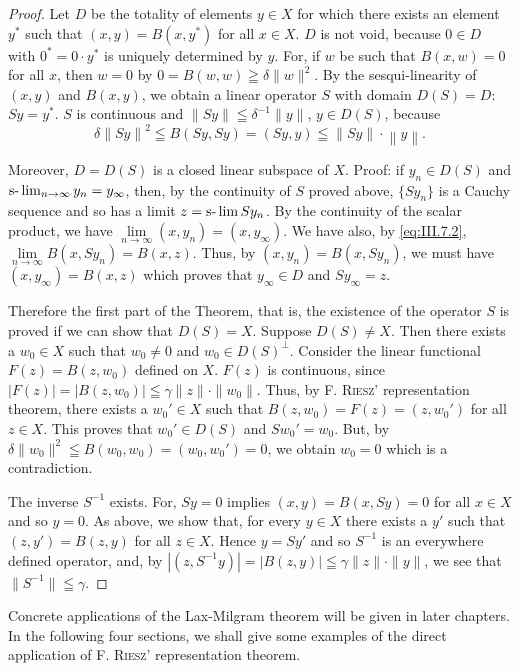 \begin{proof}
 Let $D$ be the totality of elements $y \in X$ for which there exists an element $y^*$ such that $(x, y) = B(x, y^*)$ for all $x \in X$. $D$ is not void, because $0 \in D$ with $0^* = 0 \cdot y^*$ is uniquely determined by $y$. For, if $w$ be such that $B(x, w) = 0$ for all $x$, then $w = 0$ by $0 = B(w, w) \geqq \delta \|w\|^2$. By the sesqui-linearity of $(x, y)$ and $B(x, y)$, we obtain a linear operator $S$ with domain $D(S) = D$: $Sy = y^*$. $S$ is continuous and $\|Sy\| \leqq \delta^{-1} \|y\|$, $y \in D(S)$, because 
\[
\delta \left\| S y \right\| ^{2} \leqq B (S y, S y) = (S y, y) \leqq \left\| S y \right\| \cdot \left\| y \right\|. \]

Moreover, $D = D(S)$ is a closed linear subspace of $X$. Proof: if $y_{n} \in D(S)$ and $\text{s-}\lim\nolimits_{n \to \infty} y_{n} = y_{\infty}$, then, by the continuity of $S$ proved above, $\{Sy_{n}\}$ is a Cauchy sequence and so has a limit $z = \text{s-}\lim Sy_{n}$. By the continuity of the scalar product, we have $\lim\limits_{n \to \infty} (x, y_{n}) = (x, y_{\infty})$. We have also, by \eqref{eq:III.7.2}, $\lim\limits_{n\to \infty}B(x,Sy_n) = B(x,z)$. Thus, by $(x,y_{n}) = B(x,Sy_{n})$, we must have $(x,y_{\infty}) = B(x,z)$ which proves that $y_{\infty}\in D$ and $Sy_{\infty} = z$. 

Therefore the first part of the Theorem, that is, the existence of the operator $S$ is proved if we can show that $D(S) = X$. Suppose $D(S) \neq X$. Then there exists a $w_0 \in X$ such that $w_0 \neq 0$ and $w_0 \in D(S)^\perp$. Consider the linear functional $F(z) = B(z, w_0)$ defined on $X$. $F(z)$ is continuous, since $|F(z)| = |B(z, w_0)| \leqq \gamma \|z\| \cdot \|w_0\|$. Thus, by F. \textsc{Riesz}' representation theorem, there exists a $w_0' \in X$ such that $B(z, w_0) = F(z) = (z, w_0')$ for all $z \in X$. This proves that $w_0' \in D(S)$ and $Sw_0' = w_0$. But, by $\delta \|w_0\|^2 \leqq B(w_0, w_0) = (w_0, w_0') = 0$, we obtain $w_0 = 0$ which is a contradiction. 

The inverse $S^{-1}$ exists. For, $Sy = 0$ implies $(x, y) = B(x, Sy) = 0$ for all $x \in X$ and so $y = 0$. As above, we show that, for every $y \in X$ there exists a $y'$ such that $(z, y') = B(z, y)$ for all $z \in X$. Hence $y = Sy'$ and so $S^{-1}$ is an everywhere defined operator, and, by $|(z, S^{-1}y)| = |B(z, y)| \leqq \gamma \|z\| \cdot \|y\|$, we see that $\|S^{-1}\| \leqq \gamma$. 
\end{proof}

Concrete applications of the Lax-Milgram theorem will be given in later chapters. In the following four sections, we shall give some examples of the direct application of F. \textsc{Riesz}' representation theorem. 


